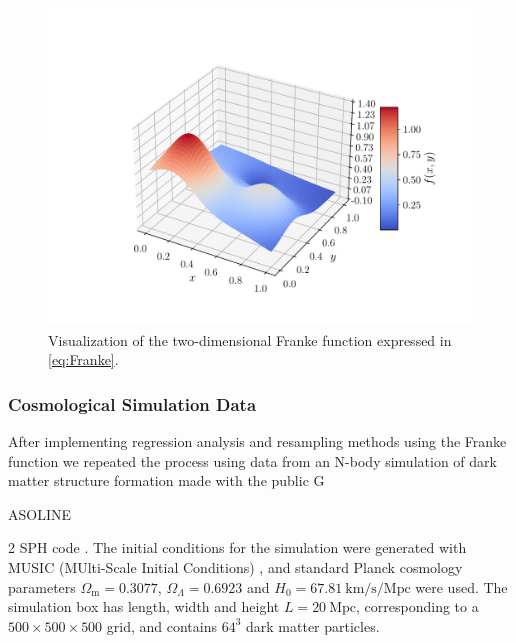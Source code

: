 \documentclass[aps,pra,english,notitlepage,reprint,nofootinbib]{revtex4-1}  %
\begin{document}
\begin{figure}[h!]
  \vspace*{-5pt}
  \centering %
  \includegraphics[trim=2.8cm 0.5cm 1.0cm 0.5cm,clip,width=\columnwidth,keepaspectratio]{../figs/a_Franke_surf.pdf}
  \caption{Visualization of the two-dimensional Franke function expressed in \eqref{eq:Franke}.}\label{fig:Franke}
  \vspace*{-5pt}
\end{figure}

\subsubsection{Cosmological Simulation Data}
After implementing regression analysis and resampling methods using the Franke function we repeated the process using data from an N-body simulation of dark matter structure formation made with the public G\begin{footnotesize}ASOLINE\end{footnotesize}2 SPH code \cite{gasoline}. The initial conditions for the simulation were generated with MUSIC (MUlti-Scale Initial Conditions) \cite{music}, and standard Planck cosmology parameters $\Omega_\text{m}=0.3077$, $\Omega_{\Lambda}=0.6923$ and $H_0=67.81\:\text{km/s/Mpc}$ were used. The simulation box has length, width and height $L=20\:\text{Mpc}$, corresponding to a $500\times500\times500$ grid, and contains $64^3$ dark matter particles. 
\end{document}
